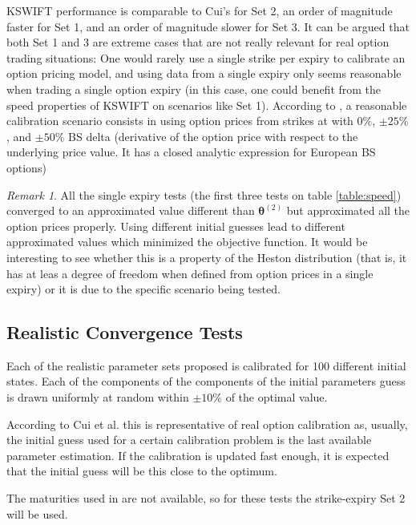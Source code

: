 \documentclass[12,twoside]{mammeTFM}
\theoremstyle{definition}
\theoremstyle{remark}
\newtheorem{remark}[thm]{Remark}
\begin{document}
KSWIFT performance is comparable to Cui's for Set 2, an order of magnitude faster for Set 1, and an order of magnitude slower for Set 3. It can be argued that both Set 1 and 3 are extreme cases that are not really relevant for real option trading situations: One would rarely use a single strike per expiry to calibrate an option pricing model, and using data from a single expiry only seems reasonable when trading a single option expiry (in this case, one could benefit from the speed properties of KSWIFT on scenarios like Set 1). According to \cite{cui17}, a reasonable calibration scenario consists in using option prices from strikes at with $0\%$, $\pm 25\%$, and $\pm 50\%$ BS delta (derivative of the option price with respect to the underlying price value. It has a closed analytic expression for European BS options)

\begin{remark}
All the single expiry tests (the first three tests on table \ref{table:speed}) converged to an approximated value different than $\boldsymbol{\theta}^{(2)}$ but approximated all the option prices properly. Using different initial guesses lead to different approximated values which minimized the objective function. It would be interesting to see whether this is a property of the Heston distribution (that is, it has at leas a degree of freedom when defined from option prices in a single expiry) or it is due to the specific scenario being tested.
\end{remark}

\subsection{Realistic Convergence Tests}

Each of the realistic parameter sets proposed is calibrated for 100 different initial states. Each of the components of the components of the initial parameters guess is drawn uniformly at random within $\pm 10\%$ of the optimal value. 

According to Cui et al. this is representative of real option calibration as, usually, the initial guess used for a certain calibration problem is the last available parameter estimation. If the calibration is updated fast enough, it is expected that the initial guess will be this close to the optimum.

The maturities used in \cite{cui17} are not available, so for these tests the strike-expiry Set 2 will be used.
\end{document}
